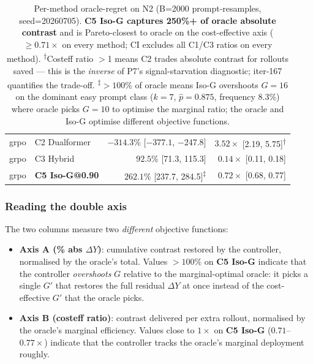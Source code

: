 \begin{table}[ht]
\begin{tabular}{llrr}
grpo   & C2 Dualformer      & $-314.3\%$ [$-377.1$, $-247.8$] & $3.52\times$ [2.19, 5.75]\textsuperscript{$\dagger$} \\
grpo   & C3 Hybrid          & $92.5\%$ [71.3, 115.3] & $0.14\times$ [0.11, 0.18] \\
grpo   & \textbf{C5 Iso-G@0.90} & $\mathbf{262.1\%}$ [237.7, 284.5]\textsuperscript{$\ddagger$} & $\mathbf{0.72\times}$ [0.68, 0.77] \\
\bottomrule
\end{tabular}
\caption{Per-method oracle-regret on N2 (B=2000 prompt-resamples, seed=20260705).
\textbf{C5 Iso-G captures 250\%+ of oracle absolute contrast} and is Pareto-closest
to oracle on the cost-effective axis ($\geq 0.71\times$ on every method;
CI excludes all C1/C3 ratios on every method).
\textsuperscript{$\dagger$}Costeff ratio $>$1 means C2 trades absolute contrast
for rollouts saved --- this is the \emph{inverse} of P7's signal-starvation
diagnostic; iter-167 quantifies the trade-off.
\textsuperscript{$\ddagger$}$> 100\%$ of oracle means Iso-G overshoots $G=16$
on the dominant easy prompt class ($k{=}7$, $\hat p = 0.875$, frequency
8.3\%) where oracle picks $G{=}10$ to optimise the marginal ratio; the
oracle and Iso-G optimise different objective functions.}
\label{tab:p7-iter167-axis}
\end{table}

\subsubsection*{Reading the double axis}

The two columns measure two \emph{different} objective functions:

\begin{itemize}
\item \textbf{Axis A (\% abs $\Delta Y$)}: cumulative contrast restored by the
      controller, normalised by the oracle's total. Values $> 100\%$ on
      \textbf{C5 Iso-G} indicate that the controller \emph{overshoots} $G$
      relative to the marginal-optimal oracle: it picks a single $G'$ that
      restores the full residual $\Delta Y$ at once instead of the
      cost-effective $G'$ that the oracle picks.
\item \textbf{Axis B (costeff ratio)}: contrast delivered per extra rollout,
      normalised by the oracle's marginal efficiency. Values close to $1\times$
      on \textbf{C5 Iso-G} ($0.71$--$0.77\times$) indicate that the controller
      tracks the oracle's marginal deployment roughly.
\end{itemize}

